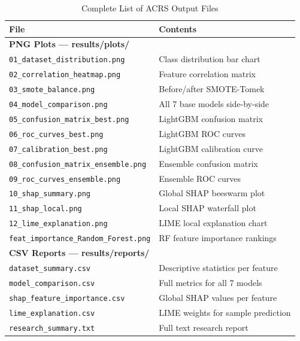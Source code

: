 \documentclass[12pt,a4paper,oneside]{report}
\begin{document}
\begin{table}[H]
\centering
\caption{Complete List of ACRS Output Files}
\label{tab:outputs}
\renewcommand{\arraystretch}{1.4}
\begin{tabular}{p{7cm} p{6cm}}
\toprule
\textbf{File} & \textbf{Contents} \\
\midrule
\multicolumn{2}{l}{\textbf{PNG Plots --- results/plots/}} \\
{\small\texttt{01\_dataset\_distribution.png}} & Class distribution bar chart \\
{\small\texttt{02\_correlation\_heatmap.png}} & Feature correlation matrix \\
{\small\texttt{03\_smote\_balance.png}} & Before/after SMOTE-Tomek \\
{\small\texttt{04\_model\_comparison.png}} & All 7 base models side-by-side \\
{\small\texttt{05\_confusion\_matrix\_best.png}} & LightGBM confusion matrix \\
{\small\texttt{06\_roc\_curves\_best.png}} & LightGBM ROC curves \\
{\small\texttt{07\_calibration\_best.png}} & LightGBM calibration curve \\
{\small\texttt{08\_confusion\_matrix\_ensemble.png}} & Ensemble confusion matrix \\
{\small\texttt{09\_roc\_curves\_ensemble.png}} & Ensemble ROC curves \\
{\small\texttt{10\_shap\_summary.png}} & Global SHAP beeswarm plot \\
{\small\texttt{11\_shap\_local.png}} & Local SHAP waterfall plot \\
{\small\texttt{12\_lime\_explanation.png}} & LIME local explanation chart \\
{\small\texttt{feat\_importance\_Random\_Forest.png}} & RF feature importance rankings \\
\midrule
\multicolumn{2}{l}{\textbf{CSV Reports --- results/reports/}} \\
{\small\texttt{dataset\_summary.csv}} & Descriptive statistics per feature \\
{\small\texttt{model\_comparison.csv}} & Full metrics for all 7 models \\
{\small\texttt{shap\_feature\_importance.csv}} & Global SHAP values per feature \\
{\small\texttt{lime\_explanation.csv}} & LIME weights for sample prediction \\
{\small\texttt{research\_summary.txt}} & Full text research report \\
\bottomrule
\end{tabular}
\end{table}
\end{document}
